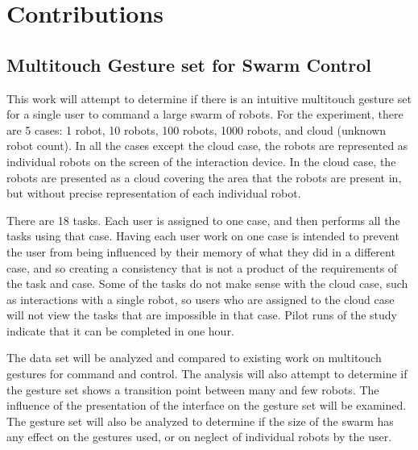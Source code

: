 \section{Contributions}

\subsection{Multitouch Gesture set for Swarm Control}
This work will attempt to determine if there is an intuitive multitouch gesture set for a single user to command a large swarm of robots.
For the experiment, there are 5 cases: 1 robot, 10 robots, 100 robots, 1000 robots, and cloud (unknown robot count). 
In all the cases except the cloud case, the robots are represented as individual robots on the screen of the interaction device. 
In the cloud case, the robots are presented as a cloud covering the area that the robots are present in, but without precise representation of each individual robot. 

There are 18 tasks. 
Each user is assigned to one case, and then performs all the tasks using that case. 
Having each user work on one case is intended to prevent the user from being influenced by their memory of what they did in a different case, and so creating a consistency that is not a product of the requirements of the task and case. 
Some of the tasks do not make sense with the cloud case, such as interactions with a single robot, so users who are assigned to the cloud case will not view the tasks that are impossible in that case.
Pilot runs of the study indicate that it can be completed in one hour. 

The data set will be analyzed and compared to existing work on multitouch gestures for command and control. 
The analysis will also attempt to determine if the gesture set shows a transition point between many and few robots. 
The influence of the presentation of the interface on the gesture set will be examined. 
The gesture set will also be analyzed to determine if the size of the swarm has any effect on the gestures used, or on neglect of individual robots by the user. 

